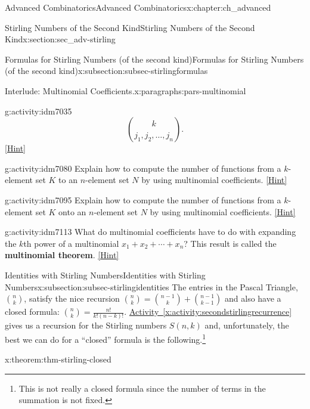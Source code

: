 \documentclass[oneside,10pt,]{book}
\newcommand{\terminology}[1]{\textbf{#1}}
\numberwithin{equation}{chapter}
\begin{document}
\begin{chapterptx}{Advanced Combinatorics}{}{Advanced Combinatorics}{}{}{x:chapter:ch_advanced}
\begin{sectionptx}{Stirling Numbers of the Second Kind}{}{Stirling Numbers of the Second Kind}{}{}{x:section:sec_adv-stirling}
\begin{subsectionptx}{Formulas for Stirling Numbers (of the second kind)}{}{Formulas for Stirling Numbers (of the second kind)}{}{}{x:subsection:subsec-stirlingformulas}
\begin{paragraphs}{Interlude: Multinomial Coefficients.}{x:paragraphs:pars-multinomial}
\begin{activity}{}{g:activity:idm7035}
\begin{equation*}
\binom{k}{j_1,j_2,\ldots, j_n}.
\end{equation*}
%
\space\hspace*{0pt}\hfill{\tiny\hyperlink{g:hint:idm7057-back}{[Hint]}}\end{activity}
\begin{activity}{}{g:activity:idm7080}%
Explain how to compute the number of functions from a \(k\)-element set \(K\) to an \(n\)-element set \(N\) by using multinomial coefficients.%
\space\hspace*{0pt}\hfill{\tiny\hyperlink{g:hint:idm7087-back}{[Hint]}}\end{activity}
\begin{activity}{}{g:activity:idm7095}%
Explain how to compute the number of functions from a \(k\)-element set \(K\) onto an \(n\)-element set \(N\) by using multinomial coefficients.%
\space\hspace*{0pt}\hfill{\tiny\hyperlink{g:hint:idm7102-back}{[Hint]}}\end{activity}
\begin{activity}{}{g:activity:idm7113}%
What do multinomial coefficients have to do with expanding the \(k\)th power of a multinomial \(x_1+x_2+\cdots+x_n\)? This result is called the \terminology{multinomial theorem}.%
\space\hspace*{0pt}\hfill{\tiny\hyperlink{g:hint:idm7119-back}{[Hint]}}\end{activity}
\end{paragraphs}%
\end{subsectionptx}
%
%
\typeout{************************************************}
\typeout{************************************************}
%
\begin{subsectionptx}{Identities with Stirling Numbers}{}{Identities with Stirling Numbers}{}{}{x:subsection:subsec-stirlingidentities}
The entries in the Pascal Triangle, \(\binom{n}{k}\), satisfy the nice recursion \(\binom{n}{k} = \binom{n - 1}{k} + \binom{n - 1}{k - 1}\) and also have a closed formula: \(\binom{n}{k} = \frac{n!}{k!(n - k)!}\). \hyperref[x:activity:secondstirlingrecurrence]{Activity~\ref{x:activity:secondstirlingrecurrence}} gives us a recursion for the Stirling numbers \(S(n,k)\) and, unfortunately, the best we can do for a ``closed'' formula is the following.\footnote{This is not really a closed formula since the number of terms in the summation is not fixed.\label{g:fn:idm7161}}%
\begin{theorem}{}{}{x:theorem:thm-stirling-closed}%

\end{theorem}
\end{subsectionptx}
\end{sectionptx}
\end{chapterptx}
\end{document}

